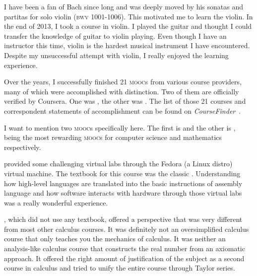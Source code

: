 	I have been a fan of Bach since long and was deeply moved by his sonatas and
	partitas for solo violin (\textsc{bwv} 1001-1006). This motivated me to
	learn the violin. In the end of 2013, I took a course in violin. I
	played the guitar and thought I could transfer the knowledge of guitar to
	violin playing. Even though I have an instructor this time, violin is the
	hardest musical instrument I have encountered. Despite my unsuccessful attempt
	with violin, I really enjoyed the learning experience.
	
	Over the years, I successfully finished 21 \textsc{mooc}s from various
	course providers, many of which were accomplished with distinction. Two of them
	are officially verified by Coursera. One was , the other
	was . The list of those 21 courses and correspondent
	statements of accomplishment can be found on
	\textit{CourseFinder}~\cite{accredible}.
	
	I want to mention two \textsc{mooc}s specifically here. The first is
	 and the other is , being the most rewarding
	\textsc{mooc}s for computer science and mathematics respectively.
	
	 provided some challenging virtual labs through the Fedora (a
	Linux distro) virtual machine. The textbook for this course was the classic
	\textcite{CSAPP}. Understanding how high-level languages are translated
	into the basic instructions of assembly language and how software interacts
	with hardware through those virtual labs was a really wonderful experience.

	, which did not use any textbook, offered a perspective that was
	very different from most other calculus courses. It was definitely not an
	oversimplified calculus course that only teaches you the mechanics of calculus.
	It was neither an analysis-like calculus course that constructs the real number
	from an axiomatic approach. It offered the right amount of justification of the
	subject as a second course in calculus and tried to unify the entire course
	through Taylor series.
	
